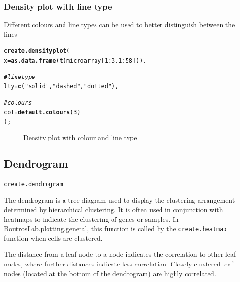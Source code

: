 \documentclass[letterpaper]{report}\usepackage[]{graphicx}\usepackage[]{color}
\makeatletter
\newcommand{\hlnum}[1]{\textcolor[rgb]{0.686,0.059,0.569}{#1}}%
\newcommand{\hlstr}[1]{\textcolor[rgb]{0.192,0.494,0.8}{#1}}%
\newcommand{\hlcom}[1]{\textcolor[rgb]{0.678,0.584,0.686}{\textit{#1}}}%
\newcommand{\hlopt}[1]{\textcolor[rgb]{0,0,0}{#1}}%
\newcommand{\hlstd}[1]{\textcolor[rgb]{0.345,0.345,0.345}{#1}}%
\newcommand{\hlkwc}[1]{\textcolor[rgb]{0.333,0.667,0.333}{#1}}%
\newcommand{\hlkwd}[1]{\textcolor[rgb]{0.737,0.353,0.396}{\textbf{#1}}}%
\newenvironment{kframe}{%
 \def\at@end@of@kframe{}%
 \ifinner\ifhmode%
  \def\at@end@of@kframe{\end{minipage}}%
  \begin{minipage}{\columnwidth}%
 \fi\fi%
 \def\FrameCommand##1{\hskip\@totalleftmargin \hskip-\fboxsep
 \colorbox{shadecolor}{##1}\hskip-\fboxsep
     \hskip-\linewidth \hskip-\@totalleftmargin \hskip\columnwidth}%
 \MakeFramed {\advance\hsize-\width
   \@totalleftmargin\z@ \linewidth\hsize
   \@setminipage}}%
 {\par\unskip\endMakeFramed%
 \at@end@of@kframe}
\newenvironment{knitrout}{}{} %
\makeatother
\begin{document}
\subsubsection{Density plot with line type}
Different colours and line types can be used to better distinguish between the lines

\begin{knitrout}
\color{fgcolor}\begin{kframe}
\begin{alltt}
\hlkwd{create.densityplot}\hlstd{(}
    \hlkwc{x} \hlstd{=} \hlkwd{as.data.frame}\hlstd{(}\hlkwd{t}\hlstd{(microarray[}\hlnum{1}\hlopt{:}\hlnum{3}\hlstd{,}\hlnum{1}\hlopt{:}\hlnum{58}\hlstd{])),}

    \hlcom{# line type}
    \hlkwc{lty} \hlstd{=} \hlkwd{c}\hlstd{(}\hlstr{"solid"}\hlstd{,} \hlstr{"dashed"}\hlstd{,} \hlstr{"dotted"}\hlstd{),}

    \hlcom{# colours}
    \hlkwc{col} \hlstd{=} \hlkwd{default.colours}\hlstd{(}\hlnum{3}\hlstd{)}
    \hlstd{);}
\end{alltt}
\end{kframe}\begin{figure}

{\centering {} 

}

\caption[Density plot with colour and line type]{Density plot with colour and line type}\label{fig:densityplot2}
\end{figure}


\end{knitrout}

\subsection{Dendrogram}
\begin{verbatim}
create.dendrogram
\end{verbatim}

The dendrogram is a tree diagram used to display the clustering arrangement determined by hierarchical clustering. It is often used in conjunction with heatmaps to indicate the clustering of genes or samples. In BoutrosLab.plotting.general, this function is called by the \verb|create.heatmap| function when cells are clustered.

The distance from a leaf node to a node indicates the correlation to other leaf nodes, where further distances indicate less correlation. Closely clustered leaf nodes (located at the bottom of the dendrogram) are highly correlated.
\end{document}
